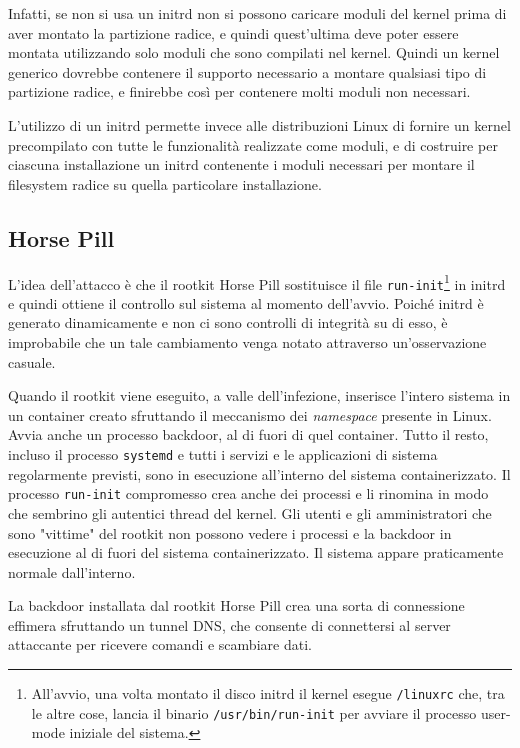\documentclass{article}
\begin{document}
Infatti, se non si usa un initrd non si possono caricare moduli del kernel prima di aver montato la partizione radice, e quindi quest'ultima deve poter essere montata utilizzando solo moduli che sono compilati nel kernel. Quindi un kernel generico dovrebbe contenere il supporto necessario a montare qualsiasi tipo di partizione radice, e finirebbe così per contenere molti moduli non necessari.

L'utilizzo di un initrd permette invece alle distribuzioni Linux di fornire un kernel precompilato con tutte le funzionalità realizzate come moduli, e di costruire per ciascuna installazione un initrd contenente i moduli necessari per montare il filesystem radice su quella particolare installazione.

\subsection{Horse Pill}
L'idea dell'attacco è che il rootkit Horse Pill sostituisce il file \texttt{run-init}\footnote{All'avvio, una volta montato il disco initrd il kernel esegue \texttt{/linuxrc} che, tra le altre cose, lancia il binario \texttt{/usr/bin/run-init} per avviare il processo user-mode iniziale del sistema.} in initrd e quindi ottiene il controllo sul sistema al momento dell'avvio. Poiché initrd è generato dinamicamente e non ci sono controlli di integrità su di esso, è improbabile che un tale cambiamento venga notato attraverso un'osservazione casuale.

Quando il rootkit viene eseguito, a valle dell'infezione, inserisce l'intero sistema in un container creato sfruttando il meccanismo dei \textsl{namespace} presente in Linux. Avvia anche un processo backdoor, al di fuori di quel container. Tutto il resto, incluso il processo \texttt{systemd} e tutti i servizi e le applicazioni di sistema regolarmente previsti, sono in esecuzione all'interno del sistema containerizzato. Il processo \texttt{run-init} compromesso crea anche dei processi e li rinomina in modo che sembrino gli autentici thread del kernel. Gli utenti e gli amministratori che sono "vittime" del rootkit non possono vedere i processi e la backdoor in esecuzione al di fuori del sistema containerizzato. Il sistema appare praticamente normale dall'interno.

La backdoor installata dal rootkit Horse Pill crea una sorta di connessione effimera sfruttando un tunnel DNS, che consente di connettersi al server attaccante per ricevere comandi e scambiare dati.
\end{document}
